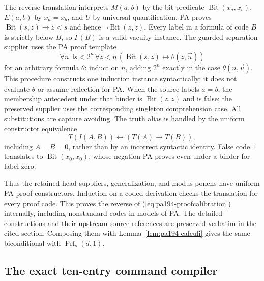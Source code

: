 The reverse translation interprets $M(a,b)$ by the bit predicate
$\operatorname{Bit}(x_a,x_b)$, $E(a,b)$ by $x_a=x_b$, and $U$
by universal quantification. PA proves
$\operatorname{Bit}(s,z)\to z<s$ and hence
$\neg\operatorname{Bit}(z,z)$. Every label in a formula of code $B$
is strictly below $B$, so $\Gamma(B)$ is a valid vacuity instance.
The guarded separation supplier uses the PA proof template
\[
 \forall n\,\exists s<2^n\,\forall z<n\,
       (\operatorname{Bit}(s,z)\leftrightarrow\theta(z,\vec u))
\]
for an arbitrary formula $\theta$: induct on $n$, adding $2^n$
exactly in the case $\theta(n,\vec u)$. This procedure constructs
one induction instance syntactically; it does not evaluate $\theta$
or assume reflection for PA. When the source labels $a=b$, the
membership antecedent under that binder is
$\operatorname{Bit}(z,z)$ and is false; the preserved supplier uses
the corresponding singleton comprehension case. All substitutions
are capture avoiding. The truth alias is handled by the uniform
constructor equivalence
\[
 T(I(A,B))\leftrightarrow(T(A)\to T(B)),
\]
including $A=B=0$, rather than by an incorrect syntactic identity.
False code $1$ translates to $\operatorname{Bit}(x_0,x_0)$, whose
negation PA proves even under a binder for label zero.

Thus the retained head suppliers, generalization, and modus ponens
have uniform PA proof constructors. Induction on a coded derivation
checks the translation for every proof code. This proves the reverse
of (\ref{eq:pa194-proofcalibration}) internally, including nonstandard
codes in models of PA. The detailed constructions and their upstream
source references are preserved verbatim in the cited section.
Composing them with Lemma~\ref{lem:pa194-calculi} gives the same
biconditional with $\operatorname{Prf}_s(d,1)$.

\subsection{The exact ten-entry command compiler}

